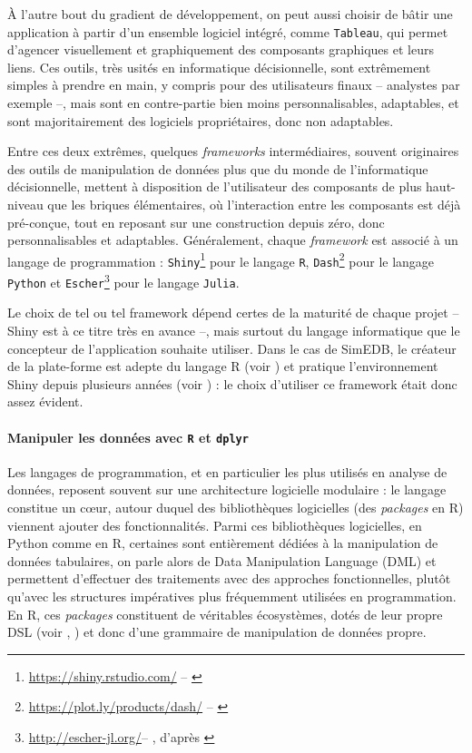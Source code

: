 À l'autre bout du gradient de développement, on peut aussi choisir de bâtir une application à partir d'un ensemble logiciel intégré, comme \texttt{Tableau}, qui permet d'agencer visuellement et graphiquement des composants graphiques et leurs liens. Ces outils, très usités en informatique décisionnelle, sont extrêmement simples à prendre en main, y compris pour des \og utilisateurs finaux\fg{} -- analystes par exemple --, mais sont en contre-partie bien moins personnalisables, adaptables, et sont majoritairement des logiciels propriétaires, donc non adaptables.

Entre ces deux extrêmes, quelques \textit{frameworks} intermédiaires, souvent originaires des outils de manipulation de données plus que du monde de l'informatique décisionnelle, mettent à disposition de l'utilisateur des composants de plus haut-niveau que les \og briques élémentaires\fg{}, où l'interaction entre les composants est déjà pré-conçue, tout en reposant sur une construction \og depuis zéro\fg{}, donc personnalisables et adaptables.
Généralement, chaque \textit{framework} est associé à un langage de programmation : \texttt{Shiny}\footnote{\href{https://shiny.rstudio.com/}{https://shiny.rstudio.com/} -- \cite{chang_shiny_2015}} pour le langage \texttt{R}, \texttt{Dash}\footnote{\href{https://plot.ly/products/dash/}{https://plot.ly/products/dash/} -- \cite{plotly_introducing_2017}} pour le langage \texttt{Python} et \texttt{Escher}\footnote{\href{http://escher-jl.org/}{http://escher-jl.org/}-- \cite{gowda_escher_2018}, d'après \cite{bezanson_julia_2014}} pour le langage \texttt{Julia}.

Le choix de tel ou tel framework dépend certes de la maturité de chaque projet -- Shiny est à ce titre très en avance --, mais surtout du langage informatique que le concepteur de l'application souhaite utiliser.
Dans le cas de SimEDB, le créateur de la plate-forme est adepte du langage R (voir \cite{commenges_r_2014}) et pratique l'environnement Shiny depuis plusieurs années (voir \cite{cura_creer_2015}) : le choix d'utiliser ce framework était donc assez évident.	

\paragraph*{Manipuler les données avec \texttt{R} et \texttt{dplyr}}

Les langages de programmation, et en particulier les plus utilisés en analyse de données, reposent souvent sur une architecture logicielle modulaire : le langage constitue un cœur, autour duquel des bibliothèques logicielles (des \textit{packages} en R) viennent ajouter des fonctionnalités.
Parmi ces bibliothèques logicielles, en Python comme en R, certaines sont entièrement dédiées à la manipulation de données tabulaires, on parle alors de \og Data Manipulation Language\fg{} (DML) et permettent d'effectuer des traitements avec des approches fonctionnelles, plutôt qu'avec les structures impératives plus fréquemment utilisées en programmation.
En R, ces \textit{packages} constituent de véritables écosystèmes, dotés de leur propre DSL (voir , ) et donc d'une grammaire de manipulation de données propre.


